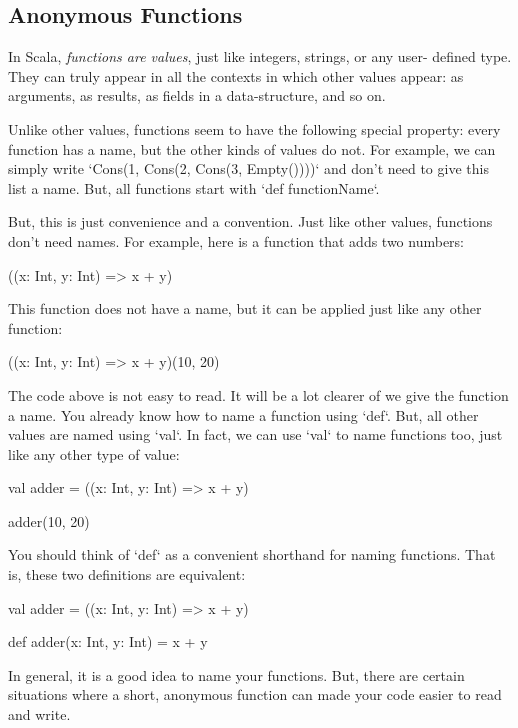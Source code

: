 \documentclass{book}
\begin{document}
\subsection{Anonymous Functions}

In Scala, \emph{functions are values}, just like integers, strings, or any user-
defined type. They can truly appear in all the contexts in which other values
appear: as arguments, as results, as fields in a data-structure, and so on.

Unlike other values, functions seem to have the following special property:
every function has a name, but the other kinds of values do not.
For example, we can simply write `Cons(1, Cons(2, Cons(3, Empty())))`
and don't need to give this list a name. But, all functions
start with `def functionName`.

But, this is just convenience and a convention. Just like other values,
functions don't need names. For example, here is a function that adds two
numbers:

\begin{scalacode}
((x: Int, y: Int) => x + y)
\end{scalacode}

This function does not have a name, but it can be applied just like
any other function:

\begin{scalacode}
((x: Int, y: Int) => x + y)(10, 20)
\end{scalacode}

The code above is not easy to read. It will be a lot clearer of we give the
function a name. You already know how to name a function using `def`. But, all
other values are named using `val`. In fact, we can use `val` to name functions
too, just like any other type of value:

\begin{scalacode}
val adder = ((x: Int, y: Int) => x + y)

adder(10, 20)
\end{scalacode}

You should think of `def` as a convenient shorthand for naming functions.
That is, these two definitions are equivalent:

\begin{scalacode}
val adder = ((x: Int, y: Int) => x + y)

def adder(x: Int, y: Int) = x + y
\end{scalacode}

In general, it is a good idea to name your functions. But, there are
certain situations where a short, anonymous function can made your code
easier to read and write.
\end{document}
